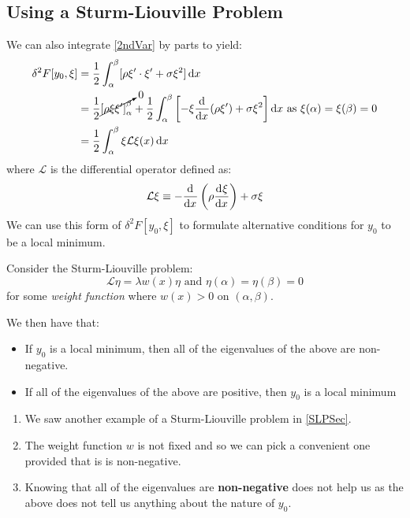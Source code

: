 \documentclass[../main.tex]{subfiles}
\begin{document}
\subsection{Using a Sturm-Liouville Problem}
We can also integrate \cref{2ndVar} by parts to yield:
\begin{align}
  \delta^2 F[y_0, \xi] &= \frac{1}{2} \int_{\alpha}^{\beta} [\rho \xi' \cdot \xi' + \sigma \xi^2] \d{x} \nonumber \\
                       &= \frac{1}{2} \cancelto{0}{\eval{\rho \xi \xi'}{\alpha}{\beta}}  + \frac{1}{2} \int_{\alpha}^{\beta} \left[-\xi\deriv{}{x}(\rho \xi') + \sigma \xi^2\right] \d{x} \text{ as $\xi(\alpha) = \xi(\beta) = 0$} \nonumber \\
                       &= \frac{1}{2}\int_{\alpha}^{\beta} \xi \mathcal{L}\xi(x) \d{x} \label{2ndVarSLP}
\end{align}
where $\mathcal{L}$ is the differential operator defined as:
\begin{equation}
  \mathcal{L}\xi \equiv -\deriv{}{x}\left(\rho \deriv{\xi}{x}\right) + \sigma \xi \label{LDef}
\end{equation}
We can use this form of $\delta^2 F[y_0, \xi]$ to formulate alternative conditions for $y_0$ to be a local minimum.
\begin{proposition}
  Consider the Sturm-Liouville problem: \label{SLPClassification}
  \[
    \mathcal{L} \eta = \lambda w(x) \eta \text{ and } \eta(\alpha) = \eta(\beta) = 0
  \]
  for some \textit{weight function} where $w(x) > 0$ on $(\alpha, \beta)$.

  We then have that:
  \begin{itemize}
    \item If $y_0$ is a local minimum, then all of the eigenvalues of the above are non-negative.
    \item If all of the eigenvalues of the above are positive, then $y_0$ is a local minimum
  \end{itemize}
\end{proposition}
\begin{remark}[Notes]
  \begin{enumerate}
    \item We saw another example of a Sturm-Liouville problem in \cref{SLPSec}.
    \item The weight function $w$ is not fixed and so we can pick a convenient one provided that is is non-negative.
    \item Knowing that all of the eigenvalues are \textbf{non-negative} does not help us as the above does not tell us anything about the nature of $y_0$.
  \end{enumerate}
\end{remark}
\end{document}
